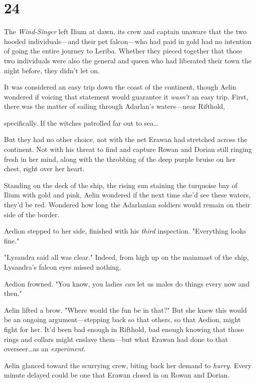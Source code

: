 
\chapter{24}

The \emph{Wind-Singer} left Ilium at dawn, its crew and captain unaware that the two hooded individuals---and their pet falcon---who had paid in gold had no intention of going the entire journey to Leriba.
Whether they pieced together that those two individuals were also the general and queen who had liberated their town the night before, they didn't let on.

It was considered an easy trip down the coast of the continent, though Aelin wondered if voicing that statement would guarantee it \emph{wasn't} an easy trip.
First, there was the matter of sailing through Adarlan's waters---near Rifthold,

specifically.
If the witches patrolled far out to sea\ldots{}

But they had no other choice, not with the net Erawan had stretched across the continent.
Not with his threat to find and capture Rowan and Dorian still ringing fresh in her mind, along with the throbbing of the deep purple bruise on her chest, right over her heart.

Standing on the deck of the ship, the rising sun staining the turquoise bay of Ilium with gold and pink, Aelin wondered if the next time she'd see these waters, they'd be red.
Wondered how long the Adarlanian soldiers would remain on their side of the border.

Aedion stepped to her side, finished with his \emph{third} inspection.
"Everything looks fine."

"Lysandra said all was clear."
Indeed, from high up on the mainmast of the ship, Lysandra's falcon eyes missed nothing.

Aedion frowned.
"You know, you ladies \emph{can} let us males do things every now and then."

Aelin lifted a brow.
"Where would the fun be in that?"
But she knew this would be an ongoing argument---stepping back so that others, so that Aedion, might fight for her.
It'd been bad enough in Rifthold, bad enough knowing that those rings and collars might enslave them---but what Erawan had done to that overseer\ldots as an \emph{experiment}.

Aelin glanced toward the scurrying crew, biting back her demand to \emph{hurry.} Every minute delayed could be one that Erawan closed in on Rowan and Dorian.


